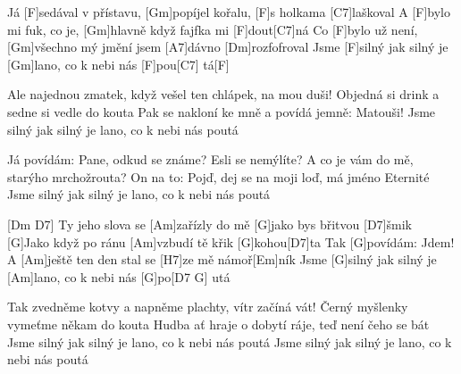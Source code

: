 
Já [F]sedával v přístavu, [Gm]popíjel kořalu, [F]s holkama [C7]laškoval
A [F]bylo mi fuk, co je, [Gm]hlavně když fajfka mi [F]dout[C7]ná
Co [F]bylo už není, [Gm]všechno mý jmění jsem [A7]dávno [Dm]rozfofroval
Jsme [F]silný jak silný je [Gm]lano, co k nebi nás [F]pou[C7] tá[F]


Ale najednou zmatek, když vešel ten chlápek, na mou duši!
Objedná si drink a sedne si vedle do kouta
Pak se nakloní ke mně a povídá jemně: Matouši!
Jsme silný jak silný je lano, co k nebi nás poutá

Já povídám: Pane, odkud se známe? Esli se nemýlíte?
A co je vám do mě, starýho mrchožrouta?
On na to: Pojď, dej se na moji loď, má jméno Eternité
Jsme silný jak silný je lano, co k nebi nás poutá

[Dm D7]
\slpc
[G]Ty jeho slova se [Am]zařízly do mě [G]jako bys břitvou [D7]\null šmik
[G]Jako když po ránu [Am]vzbudí tě křik [G]kohou[D7]ta
Tak [G]povídám: Jdem! A [Am]ještě ten den stal se [H7]ze mě námoř[Em]ník
Jsme [G]silný jak silný je [Am]lano, co k nebi nás [G]po[D7 G] utá


Tak zvedněme kotvy a napněme plachty, vítr začíná vát!
Černý myšlenky vymeťme někam do kouta
Hudba ať hraje o dobytí ráje, teď není čeho se bát
Jsme silný jak silný je lano, co k nebi nás poutá
Jsme silný jak silný je lano, co k nebi nás poutá
